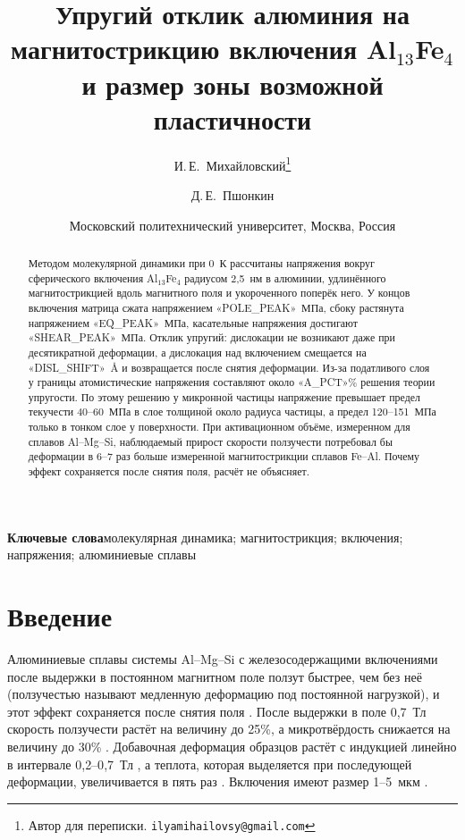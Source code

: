 \documentclass[11pt,a4paper]{article}
\title{Упругий отклик алюминия на магнитострикцию включения Al$_{13}$Fe$_4$
и размер зоны возможной пластичности}
\author{И.\,Е.~Михайловский\thanks{Автор для переписки.
\texttt{ilyamihailovsy@gmail.com}} \and Д.\,Е.~Пшонкин}
\date{Московский политехнический университет, Москва, Россия}
\begin{document}
\maketitle

\begin{abstract}
Методом молекулярной динамики при 0~К рассчитаны напряжения вокруг
сферического включения Al$_{13}$Fe$_4$ радиусом 2{,}5~нм в алюминии,
удлинённого магнитострикцией вдоль магнитного поля и укороченного поперёк
него. У концов включения матрица сжата напряжением «POLE_PEAK»~МПа, сбоку
растянута напряжением «EQ_PEAK»~МПа, касательные напряжения достигают
«SHEAR_PEAK»~МПа. Отклик упругий: дислокации не возникают даже при
десятикратной деформации, а дислокация над включением смещается на
«DISL_SHIFT»~\AA{} и возвращается после снятия деформации. Из-за
податливого слоя у границы атомистические напряжения составляют около
«A_PCT»\% решения теории упругости. По этому решению у микронной частицы
напряжение превышает предел текучести 40--60~МПа в слое толщиной около
радиуса частицы, а предел 120--151~МПа только в тонком слое
у поверхности. При активационном объёме, измеренном для сплавов
Al--Mg--Si, наблюдаемый прирост скорости ползучести потребовал бы
деформации в 6--7 раз больше измеренной магнитострикции сплавов Fe--Al.
Почему эффект сохраняется после снятия поля, расчёт не объясняет.
\end{abstract}

\noindent\textbf{Ключевые слова}\quad молекулярная динамика;
магнитострикция; включения; напряжения; алюминиевые сплавы

\section{Введение}

Алюминиевые сплавы системы Al--Mg--Si с железосодержащими включениями
после выдержки в постоянном магнитном поле ползут быстрее, чем без неё
(ползучестью называют медленную деформацию под постоянной нагрузкой),
и этот эффект сохраняется после снятия поля
\cite{Skvortsov2019JAP,Skvortsov2019PSS,Friha2024JMMM,Nikolaev2025SciRep}.
После выдержки в поле 0{,}7~Тл скорость ползучести растёт на величину
до 25\%, а микротвёрдость снижается на величину до 30\% \cite{Skvortsov2019JAP}.
Добавочная деформация образцов растёт с индукцией линейно в интервале
0{,}2--0{,}7~Тл \cite{Friha2024JMMM}, а теплота, которая выделяется при
последующей деформации, увеличивается в пять раз \cite{Pshonkin2025ZL}.
Включения имеют размер 1--5~мкм \cite{Skvortsov2019JAP,Pshonkin2025ZL}.
\end{document}
